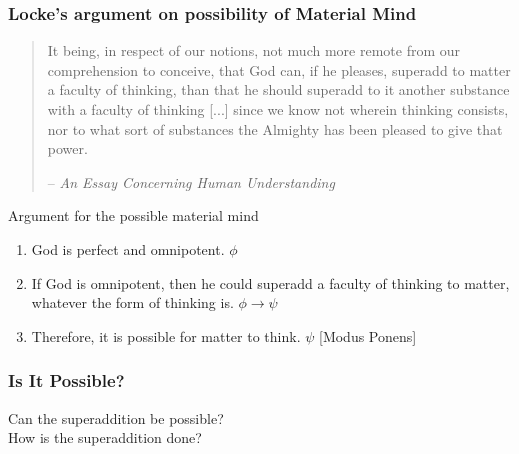 \documentclass{beamer}
\begin{document}
\begin{frame}
    \frametitle{Locke's argument on possibility of Material Mind}
    \begin{quote}
        It being, in respect of our notions, not much more remote from our comprehension to conceive, that God can, if he pleases, superadd to matter a faculty of thinking, than that he should superadd to it another substance with a faculty of thinking [...] since we know not wherein thinking consists, nor to what sort of substances the Almighty has been pleased to give that power.
        \par{\hfill-- \textit{An Essay Concerning Human Understanding}}
    \end{quote}
    \begin{block}{Argument for the possible material mind}
        \begin{enumerate}
            \item<1> God is perfect and omnipotent. $\phi$
            \item<1,2> If God is omnipotent, then he could superadd a faculty of thinking to matter,
            whatever the form of thinking is. $\phi \rightarrow \psi$
            \item<1> Therefore, it is possible for matter to think. $\psi$ [Modus Ponens]
        \end{enumerate}
    \end{block}
\end{frame}

\begin{frame}
    \frametitle{Is It Possible?}
    \centering
    Can the superaddition be possible? \\
    How is the superaddition done?
\end{frame}
\end{document}
